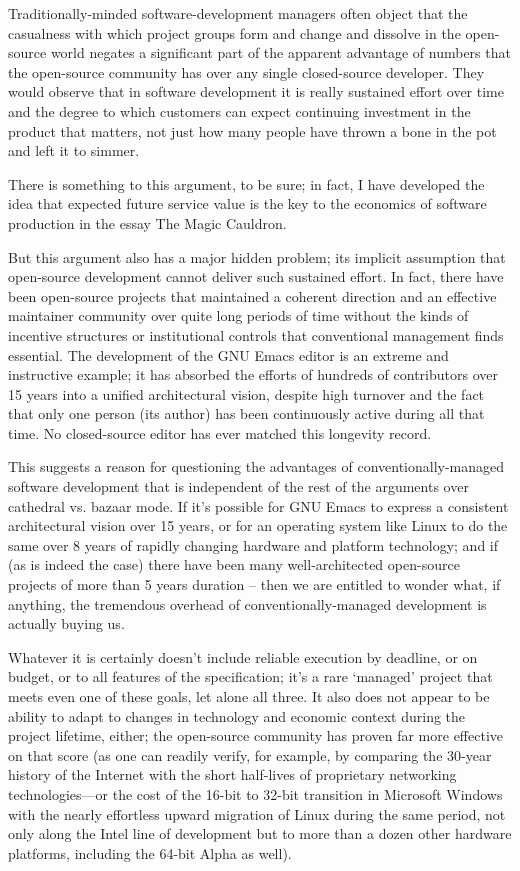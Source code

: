 \documentclass[a4paper,12pt,UTF8,twoside]{ctexbook}
\begin{document}
Traditionally-minded software-development managers often object that the casualness with which project groups form and change and dissolve in the open-source world negates a significant part of the apparent advantage of numbers that the open-source community has over any single closed-source developer. They would observe that in software development it is really sustained effort over time and the degree to which customers can expect continuing investment in the product that matters, not just how many people have thrown a bone in the pot and left it to simmer.

There is something to this argument, to be sure; in fact, I have developed the idea that expected future service value is the key to the economics of software production in the essay The Magic Cauldron.

But this argument also has a major hidden problem; its implicit assumption that open-source development cannot deliver such sustained effort. In fact, there have been open-source projects that maintained a coherent direction and an effective maintainer community over quite long periods of time without the kinds of incentive structures or institutional controls that conventional management finds essential. The development of the GNU Emacs editor is an extreme and instructive example; it has absorbed the efforts of hundreds of contributors over 15 years into a unified architectural vision, despite high turnover and the fact that only one person (its author) has been continuously active during all that time. No closed-source editor has ever matched this longevity record.

This suggests a reason for questioning the advantages of conventionally-managed software development that is independent of the rest of the arguments over cathedral vs. bazaar mode. If it's possible for GNU Emacs to express a consistent architectural vision over 15 years, or for an operating system like Linux to do the same over 8 years of rapidly changing hardware and platform technology; and if (as is indeed the case) there have been many well-architected open-source projects of more than 5 years duration -- then we are entitled to wonder what, if anything, the tremendous overhead of conventionally-managed development is actually buying us.

Whatever it is certainly doesn't include reliable execution by deadline, or on budget, or to all features of the specification; it's a rare `managed' project that meets even one of these goals, let alone all three. It also does not appear to be ability to adapt to changes in technology and economic context during the project lifetime, either; the open-source community has proven far more effective on that score (as one can readily verify, for example, by comparing the 30-year history of the Internet with the short half-lives of proprietary networking technologies—or the cost of the 16-bit to 32-bit transition in Microsoft Windows with the nearly effortless upward migration of Linux during the same period, not only along the Intel line of development but to more than a dozen other hardware platforms, including the 64-bit Alpha as well).
\end{document}
